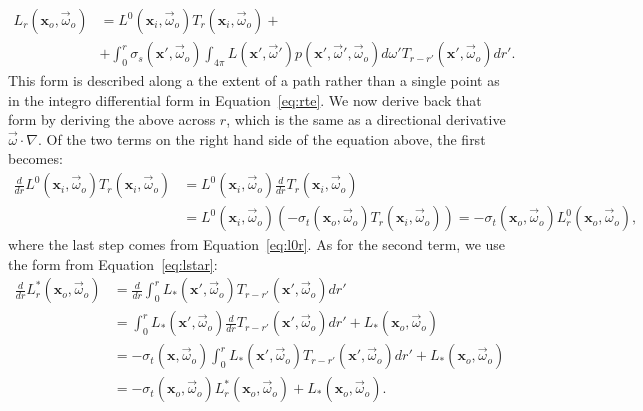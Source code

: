\begin{equation}
\begin{split}
\label{eq:integralformrte}
L_r(\mathbf{x}_o, \vec{\omega}_o) &=  L^0(\mathbf{x}_i, \vec{\omega}_o) T_r(\mathbf{x}_i, \vec{\omega}_o) + \\ &+\int_0^r \sigma_s(\mathbf{x}', \vec{\omega}_o) \int_{4\pi} L(\mathbf{x}', \vec{\omega}') p(\mathbf{x}', \vec{\omega}', \vec{\omega}_o)  d\omega' T_{r-r'}(\mathbf{x}', \vec{\omega}_o)  dr'.
\end{split}
\end{equation}
This form is described along a the extent of a path rather than a single point as in the integro differential form in Equation~\ref{eq:rte}. We now derive back that form by deriving the above across $r$, which is the same as a directional derivative $ \vec{\omega} \cdot \nabla$. Of the two terms on the right hand side of the equation above, the first becomes:
\begin{equation*}
\begin{split}
\frac{d}{dr} L^0(\mathbf{x}_i, \vec{\omega}_o) T_r(\mathbf{x}_i, \vec{\omega}_o) &= L^0(\mathbf{x}_i, \vec{\omega}_o) \frac{d}{dr}  T_r(\mathbf{x}_i, \vec{\omega}_o) \\
&= L^0(\mathbf{x}_i, \vec{\omega}_o) (-\sigma_t(\mathbf{x}_o, \vec{\omega}_o) T_r(\mathbf{x}_i, \vec{\omega}_o)) = -\sigma_t(\mathbf{x}_o, \vec{\omega}_o) L_r^0(\mathbf{x}_o, \vec{\omega}_o),
\end{split}
\end{equation*}
where the last step comes from Equation~\ref{eq:l0r}. As for the second term, we use the form from Equation~\ref{eq:lstar}:
\begin{equation*}
\begin{split}
\frac{d}{dr} L^*_r(\mathbf{x}_o, \vec{\omega}_o) &= \frac{d}{dr} \int_0^r L_*(\mathbf{x}', \vec{\omega}_o) T_{r-r'}(\mathbf{x}', \vec{\omega}_o)  dr' \\
&= \int_0^r L_*(\mathbf{x}', \vec{\omega}_o) \frac{d}{dr} T_{r-r'}(\mathbf{x}', \vec{\omega}_o)  dr' + L_*(\mathbf{x}_o, \vec{\omega}_o)
 \\
 &= -\sigma_t(\mathbf{x}, \vec{\omega}_o)  \int_0^r L_*(\mathbf{x}', \vec{\omega}_o) T_{r-r'}(\mathbf{x}', \vec{\omega}_o)  dr' + L_*(\mathbf{x}_o, \vec{\omega}_o) \\
 &= -\sigma_t(\mathbf{x}_o, \vec{\omega}_o) L^*_r(\mathbf{x}_o, \vec{\omega}_o) + L_*(\mathbf{x}_o, \vec{\omega}_o).
\end{split}
\end{equation*}
